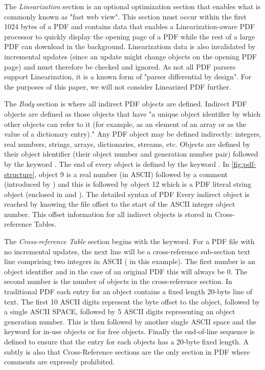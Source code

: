 The \emph{Linearization} section is an optional optimization section that enables what is commonly
known as "fast web view". This section must occur within the first 1024 bytes of a PDF and contains
data that enables a Linearization-aware PDF processor to quickly display the opening page of a PDF
while the rest of a large PDF can download in the background.
Linearizatiom data is also invalidated by incremental updates (since an update might change objects
on the opening PDF page) and must therefore be checked and ignored.
As not all PDF parsers support Linearization, it is a known form of "parser differential by design". 
For the purposes of this paper, we will not consider Linearized PDF further.

The \emph{Body} section is where all indirect PDF objects are defined. Indirect PDF objects
are defined as those objects that have "a unique object identifier by which other objects can
refer to it (for example, as an element of an array or as the value of a dictionary entry)."
Any PDF object may be defined indirectly: integers, real numbers, strings, arrays, dictionaries, 
streams, etc. Objects are defined by their object identifier (their object number and generation 
number pair) followed by the keyword . 
The end of every object is defined by the keyword .
In \cref{fig:pdf-structure}, object 9 is a real number (in ASCII) followed by a comment
(introduced by \lstcd{\%}) and this is followed by object 12 which is a PDF literal string object
(enclosed in \lstcd{(} and \lstcd{)}). The detailed syntax of PDF  
Every indirect object is reached by knowing the file offset to the start of the ASCII integer 
object number. This offset information for all indirect objects is stored in Cross-reference Tables.

The \emph{Cross-reference Table} section begins with the  keyword. For a PDF file
with no incremental updates, the next line will be a cross-reference sub-section text line comprising
two integers in ASCII ( in this example). The first number is an object identifier 
and in the case of an original PDF this will always be 0. The second number is the number of
objects in the cross-reference section.
In traditional PDF each entry for an object contains a fixed length 20-byte line of text.
The first 10 ASCII digits represent the byte offset to the object, followed by a single ASCII SPACE, 
followed by 5 ASCII digits representing an object generation number. This is then followed by
another single ASCII space and the keyword  for in-use objects or  for free objects.
Finally the end-of-line sequence is defined to ensure that the entry for each objects has 
a 20-byte fixed length. A subtly is also that Cross-Reference sections are the only section in PDF where comments are expressly prohibited.


